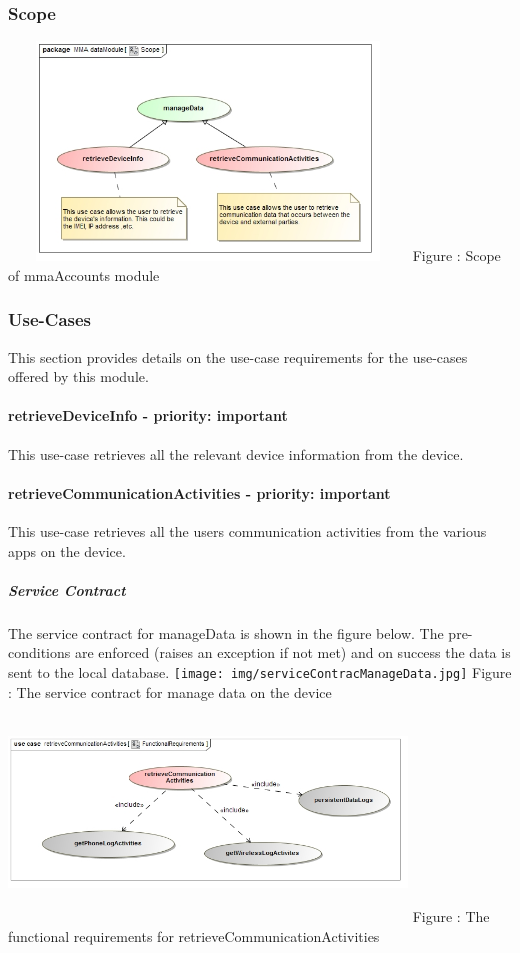 \documentclass[hidelinks, 12pt, oneside]{article}
\begin{document}
	\subsubsection{Scope}
		\includegraphics[width=400px,height=220px]{img/scopeData.jpg}
		Figure : Scope of mmaAccounts module	
	
	\subsubsection{Use-Cases}
		This section provides details on the use-case requirements for the use-cases offered by this module.	
		
	\paragraph{retrieveDeviceInfo - priority: important}
		This use-case retrieves all the relevant device information from the device.\newline
	\paragraph{retrieveCommunicationActivities - priority: important}
		This use-case retrieves all the users communication activities from the various apps on the device.\newline
\subparagraph{Service Contract}
		The service contract for manageData is shown in the figure below. The pre-conditions are enforced (raises an exception if not met) and on
		success the data is sent to the local database.\newline	
	\texttt{[image: img/serviceContracManageData.jpg]}
		Figure : The service contract for manage data on the device\newline
	\includegraphics[width=400px,height=220px]{img/functionalRequirementsRetrieveCommunicationActivities.jpg}
		Figure : The functional requirements for retrieveCommunicationActivities\newline
	
\end{document}
